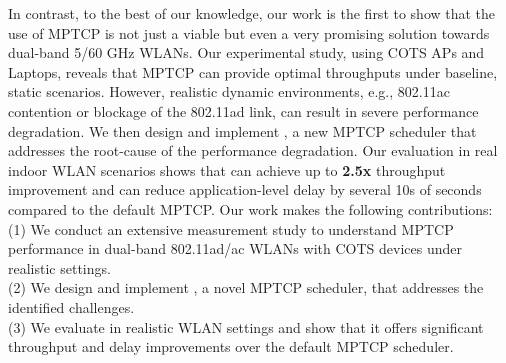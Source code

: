 In contrast, to the best of our knowledge, our work is the first to 
show that the use of MPTCP is not just a viable but even a very promising solution
towards dual-band 5/60 GHz WLANs. 
Our experimental study, using COTS APs and Laptops, reveals that 
MPTCP can provide optimal throughputs under baseline, static scenarios.
However, realistic dynamic environments, e.g., 802.11ac contention or 
blockage of the 802.11ad link, 
can result in severe performance degradation. We then design and implement \name, a new
MPTCP scheduler that addresses the root-cause of the performance
degradation.
Our evaluation in real
indoor WLAN scenarios shows that \name can achieve up to \textbf{2.5x}
throughput improvement and can reduce application-level delay by several
10s of seconds compared to the default MPTCP.
Our work makes the following contributions:
\\
(1) We conduct an extensive measurement study to understand MPTCP
performance in dual-band 802.11ad/ac WLANs with COTS devices under
realistic settings.
\\
(2) We design and implement \name, a novel MPTCP scheduler, that
addresses the identified challenges.
\\
(3) We evaluate \name in realistic WLAN settings and show that it
offers significant throughput and delay improvements over the default
MPTCP scheduler.
\fi
